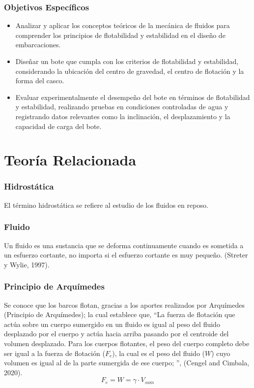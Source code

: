 \documentclass[a4paper,letterpaper]{article}
\begin{document}
\subsubsection*{Objetivos Específicos}
\begin{itemize}
	\item Analizar y aplicar los conceptos teóricos de la mecánica de fluidos para comprender los principios de flotabilidad y estabilidad en el diseño de embarcaciones.
	\item Diseñar un bote que cumpla con los criterios de flotabilidad y estabilidad, considerando la ubicación del centro de gravedad, el centro de flotación y la forma del casco.
	\item Evaluar experimentalmente el desempeño del bote en términos de flotabilidad y estabilidad, realizando pruebas en condiciones controladas de agua y registrando datos relevantes como la inclinación, el desplazamiento y la capacidad de carga del bote.
\end{itemize}
\newpage

\section*{Teoría Relacionada}
\subsubsection*{Hidrostática}
\setlength{\parindent}{18pt}

El término hidrostática se refiere al estudio de los fluidos en reposo.

\subsubsection*{Fluido}
\setlength{\parindent}{18pt}
Un fluido es una sustancia que se deforma continuamente cuando es sometida 
a un esfuerzo cortante, no importa si el esfuerzo cortante es muy pequeño. (Streter y Wylie, 1997). 

\subsubsection*{Principio de Arquímedes}
\setlength{\parindent}{18pt}
Se conoce que los barcos flotan, gracias a los aportes realizados por Arquímedes (Principio de Arquímedes);
la cual establece que, ``La fuerza de flotación que actúa sobre un cuerpo sumergido en un fluido es igual
al peso del fluido desplazado por el cuerpo y actúa hacia arriba pasando por el
centroide del volumen desplazado. Para los cuerpos flotantes, el peso del cuerpo completo debe ser igual a la fuerza
de flotación ($F_{e}$), la cual es el peso del fluido ($W$) cuyo volumen es igual al de la parte sumergida
de ese cuerpo; '', (Cengel and Cimbala, 2020). 
\begin{equation}
	F_{e}= W = \gamma \cdot  V_{sum} 
\end{equation}
\end{document}
